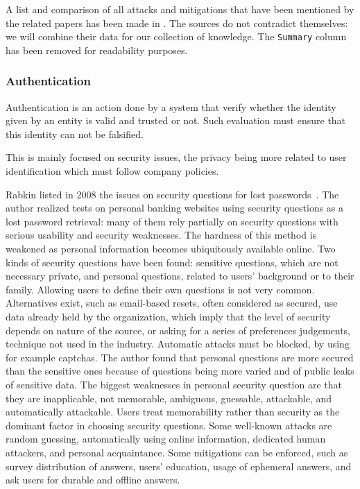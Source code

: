 A list and comparison of all attacks and mitigations that have been mentioned by the related papers has been made in . The sources do not contradict themselves: we will combine their data for our collection of knowledge. The \texttt{Summary} column has been removed for readability purposes.

\subsubsection{Authentication}
\label{subsubsec:state_review_results_authentication}

Authentication is an action done by a system that verify whether the identity given by an entity is valid and trusted or not. Such evaluation must ensure that this identity can not be falsified.

This is mainly focused on security issues, the privacy being more related to user identification which must follow company policies.

Rabkin listed in 2008 the issues on security questions for lost passwords~\cite{rabkin_personal_2008}. The author realized tests on personal banking websites using security questions as a lost password retrieval: many of them rely partially on security questions with serious usability and security weaknesses. The hardness of this method is weakened as personal information becomes ubiquitously available online. Two kinds of security questions have been found: sensitive questions, which are not necessary private, and personal questions, related to users' background or to their family. Allowing users to define their own questions is not very common. Alternatives exist, such as email-based resets, often considered as secured, use data already held by the organization, which imply that the level of security depends on nature of the source, or asking for a series of preferences judgements, technique not used in the industry. Automatic attacks must be blocked, by using for example \glspl{captcha}. The author found that personal questions are more secured than the sensitive ones because of questions being more varied and of public leaks of sensitive data. The biggest weaknesses in personal security question are that they are inapplicable, not memorable, ambiguous, guessable, attackable, and automatically attackable. Users treat memorability rather than security as the dominant factor in choosing security questions. Some well-known attacks are random guessing, automatically using online information, dedicated human attackers, and personal acquaintance. Some mitigations can be enforced, such as survey distribution of answers, users' education, usage of ephemeral answers, and ask users for durable and offline answers. %

